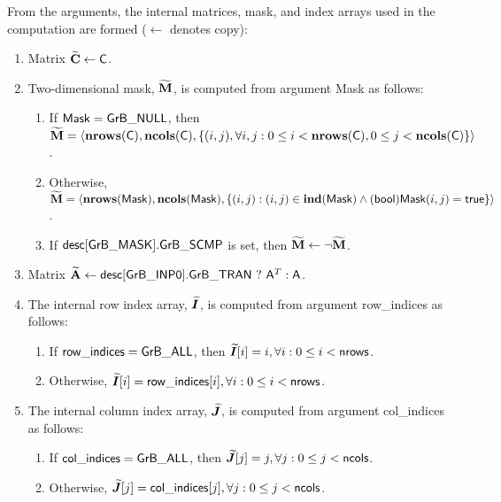 From the arguments, the internal matrices, mask, and index arrays used in 
the computation are formed ($\leftarrow$ denotes copy):
\begin{enumerate}
	\item Matrix ${\bf \widetilde{C}} \leftarrow {\sf C}$.

	\item Two-dimensional mask, ${\bf \widetilde{M}}$, is computed from
    argument {\sf Mask} as follows:
	\begin{enumerate}
		\item	If ${\sf Mask} = {\sf GrB\_NULL}$, then ${\bf \widetilde{M}} = 
        \langle \bold{nrows}({\sf C}), \bold{ncols}({\sf C}), \{(i,j), 
        \forall i,j : 0 \leq i <  \bold{nrows}({\sf C}), 0 \leq j < 
        \bold{ncols}({\sf C}) \} \rangle$.

		\item	Otherwise, ${\bf \widetilde{M}} = \langle \bold{nrows}({\sf Mask}), 
        \bold{ncols}({\sf Mask}), \{(i,j) : (i,j) \in \bold{ind}({\sf Mask}) \wedge 
        ({\sf bool}){\sf Mask}(i,j) = {\sf true}\} \rangle$.

		\item	If ${\sf desc[GrB\_MASK].GrB\_SCMP}$ is set, then 
        ${\bf \widetilde{M}} \leftarrow \neg {\bf \widetilde{M}}$.
	\end{enumerate}

	\item Matrix ${\bf \widetilde{A}} \leftarrow
    {\sf desc[GrB\_INP0].GrB\_TRAN} \ ? \ {\sf A}^T : {\sf A}$.

    \item The internal row index array, $\bm{\widetilde{I}}$, is computed from 
    argument {\sf row\_indices} as follows:
	\begin{enumerate}
		\item	If ${\sf row\_indices} = {\sf GrB\_ALL}$, then 
        $\bm{\widetilde{I}}[i] = i, \forall i : 0 \leq i < {\sf nrows}$.

		\item	Otherwise, $\bm{\widetilde{I}}[i] = {\sf row\_indices}[i], 
        \forall i : 0 \leq i < {\sf nrows}$.
    \end{enumerate}
    
    \item The internal column index array, $\bm{\widetilde{J}}$, is computed from 
    argument {\sf col\_indices} as follows:
	\begin{enumerate}
		\item	If ${\sf col\_indices} = {\sf GrB\_ALL}$, then 
        $\bm{\widetilde{J}}[j] = j, \forall j : 0 \leq j < {\sf ncols}$.

		\item	Otherwise, $\bm{\widetilde{J}}[j] = {\sf col\_indices}[j], 
        \forall j : 0 \leq j < {\sf ncols}$.
    \end{enumerate}
\end{enumerate}

